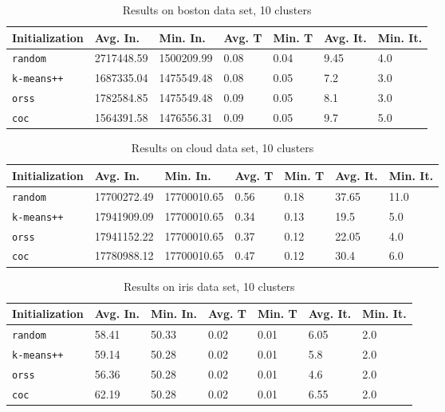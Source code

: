 \documentclass[twoside, 11pt]{article}
\begin{document}
		\begin{table}[p]
			\begin{center}
				\begin{tabular}{|l|l|l|l|l|l|l|}
					\hline
					Initialization & Avg. In. & Min. In. & Avg. T & Min. T & Avg. It. & Min. It.\\\hline
					\texttt{random} & 2717448.59 & 1500209.99 & 0.08 & 0.04 & 9.45 & 4.0\\\hline
					\texttt{k-means++} & 1687335.04 & 1475549.48 & 0.08 & 0.05 & 7.2 & 3.0\\\hline
					\texttt{orss} & 1782584.85 & 1475549.48 & 0.09 & 0.05 & 8.1 & 3.0\\\hline
					\texttt{coc} & 1564391.58 & 1476556.31 & 0.09 & 0.05 & 9.7 & 5.0\\\hline
				\end{tabular}
				\caption{Results on boston data set, 10 clusters}
				\label{tbl:boston10}
			\end{center}
		\end{table}
		
		\begin{table}[p]
			\begin{center}
				\begin{tabular}{|l|l|l|l|l|l|l|}
					\hline
					Initialization & Avg. In. & Min. In. & Avg. T & Min. T & Avg. It. & Min. It.\\\hline
					\texttt{random} & 17700272.49 & 17700010.65 & 0.56 & 0.18 & 37.65 & 11.0\\\hline
					\texttt{k-means++} & 17941909.09 & 17700010.65 & 0.34 & 0.13 & 19.5 & 5.0\\\hline
					\texttt{orss} & 17941152.22 & 17700010.65 & 0.37 & 0.12 & 22.05 & 4.0\\\hline
					\texttt{coc} & 17780988.12 & 17700010.65 & 0.47 & 0.12 & 30.4 & 6.0\\\hline
				\end{tabular}
				\caption{Results on cloud data set, 10 clusters}
				\label{tbl:cloud10}
			\end{center}
		\end{table}
		
		\begin{table}[p]
			\begin{center}
				\begin{tabular}{|l|l|l|l|l|l|l|}
					\hline
					Initialization & Avg. In. & Min. In. & Avg. T & Min. T & Avg. It. & Min. It.\\\hline
					\texttt{random} & 58.41 & 50.33 & 0.02 & 0.01 & 6.05 & 2.0\\\hline
					\texttt{k-means++} & 59.14 & 50.28 & 0.02 & 0.01 & 5.8 & 2.0\\\hline
					\texttt{orss} & 56.36 & 50.28 & 0.02 & 0.01 & 4.6 & 2.0\\\hline
					\texttt{coc} & 62.19 & 50.28 & 0.02 & 0.01 & 6.55 & 2.0\\\hline
				\end{tabular}
				\caption{Results on iris data set, 10 clusters}
				\label{tbl:iris10}
			\end{center}
		\end{table}
		
\end{document}
